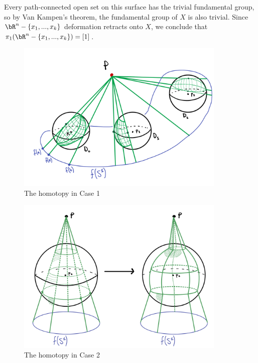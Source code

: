 \begin{homework}[e]
\begin{prf}
Every path-connected open set on this surface has the trivial fundamental group, so by Van Kampen's theorem, the fundamental group of $X$ is also trivial. Since $\bR^n - \{x_1,...,x_k\}$ deformation retracts onto $X$, we conclude that $\pi_1(\bR^n - \{x_1,...,x_k\}) = [1]$. 
\end{prf}
\bigskip
{}
\newpage
\begin{figure}[h]
    \centering
    \includegraphics[width=10cm]{./figures/hwk2-fig1.jpg}
    \caption{The homotopy in Case 1}
    \label{fig:case1}
\end{figure}
\begin{figure}[h]
    \centering
    \includegraphics[width=10cm]{./figures/hwk2-fig3.jpg}
    \caption{The homotopy in Case 2}
    \label{fig:case2}
\end{figure}


\end{homework}
